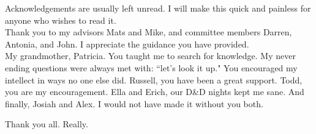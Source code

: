 Acknowledgements are usually left unread. I will make this quick and painless for anyone who wishes to read it. \\

Thank you to my advisors Mats and Mike, and committee members Darren, Antonia, and John. I appreciate the guidance you have provided.\\

My grandmother, Patricia. You taught me to search for knowledge.  My never ending questions were always met with: ``let's look it up." You encouraged my intellect in ways no one else did. Russell, you have been a great support. Todd, you are my encouragement. Ella and Erich, our D\&D nights kept me sane. And finally, Josiah and Alex. I would not have made it without you both. 

Thank you all. Really. 


